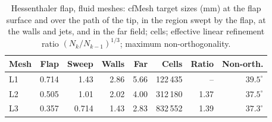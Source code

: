 \begin{table}[htbp]
	\centering
	\small
	\caption{Hessenthaler flap, fluid meshes: cfMesh target sizes (mm) at the flap surface and over the path of the tip, in the region swept by the flap, at the walls and jets, and in the far field; cells; effective linear refinement ratio $(N_k/N_{k-1})^{1/3}$; maximum non-orthogonality.}
	\label{tab:hessenthaler_meshes}
	\begin{tabular}{lrrrrrrr}
		\toprule
		Mesh & Flap & Sweep & Walls & Far & Cells & Ratio & Non-orth. \\
		\midrule
		L1 & 0.714 & 1.43 & 2.86 & 5.66 & 122\,435 & -- & $39.5^\circ$ \\
		L2 & 0.505 & 1.01 & 2.02 & 4.00 & 312\,180 & 1.37 & $37.5^\circ$ \\
		L3 & 0.357 & 0.714 & 1.43 & 2.83 & 832\,552 & 1.39 & $37.3^\circ$ \\
		\bottomrule
	\end{tabular}
\end{table}

